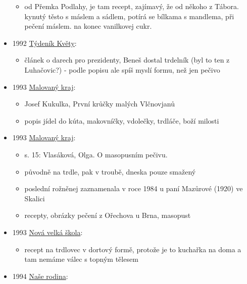 \begin{itemize}
  \begin{itemize}
  \tightlist
  \item
    od Přemka Podlahy, je tam recept, zajímavý, že od někoho z Tábora.
    kynutý těsto s máslem a sádlem, potírá se bílkama s mandlema, při
    pečení máslem. na konec vanilkovej cukr.
  \end{itemize}
\item
  1992
  \href{https://ndk.cz/uuid/uuid:2a7057e0-8b35-11e3-8031-001018b5eb5c}{Týdeník
  Květy}:

  \begin{itemize}
  \tightlist
  \item
    článek o darech pro prezidenty, Beneš dostal trdelník (byl to ten z
    Luhačovic?) - podle popisu ale spíš myslí formu, než jen pečivo
  \end{itemize}
\item
  1993
  \href{https://ceskadigitalniknihovna.cz/uuid/uuid:788f9b30-023f-11e4-97de-5ef3fc9ae867}{Malovaný
  kraj}:

  \begin{itemize}
  \tightlist
  \item
    Josef Kukulka, První krůčky malých Vlčnovjanů
  \item
    popis jídel do kúta, makovníčky, vdolečky, trdláče, boží milosti
  \end{itemize}
\item
  1993
  \href{https://ceskadigitalniknihovna.cz/uuid/uuid:c6a2f3b0-0381-11e4-97de-5ef3fc9ae867}{Malovaný
  kraj}:

  \begin{itemize}
  \tightlist
  \item
    s. 15: Vlasáková, Olga. O masopusním pečivu.
  \item
    původně na trdle, pak v troubě, dneska pouze smažený
  \item
    poslední rožněnej zaznamenala v roce 1984 u paní Mazůrové (1920) ve
    Skalici
  \item
    recepty, obrázky pečení z Ořechova u Brna, masopust
  \end{itemize}
\item
  1993
  \href{https://ceskadigitalniknihovna.cz/view/uuid:e294a2f0-8260-11e3-a6e0-005056827e52?page=uuid:32da4ff0-96d7-11e3-ad99-001018b5eb5c&fulltext=trdlovec&source=mzk}{Nová
  velká škola}:

  \begin{itemize}
  \tightlist
  \item
    recept na trdlovec v dortový formě, protože je to kuchařka na doma a
    tam nemáme válec s topným tělesem
  \end{itemize}
\item
  1994
  \href{https://ceskadigitalniknihovna.cz/uuid/uuid:7e0705a0-528b-11e6-beb0-001018b5eb5c}{Naše
  rodina}:


\end{itemize}
